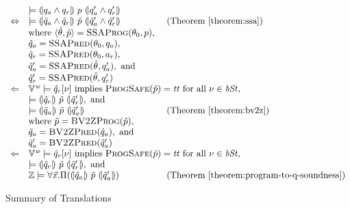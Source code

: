 \begin{figure}
\[
  \begin{array}{cll}
    & \models \hoaretriple{q_a \wedge q_r}{p}{q_a' \wedge q_r'}\\
    \Leftrightarrow
    & \models
      \hoaretriple{\hat{q}_a \wedge \hat{q}_r}
      {\hat{p}}
      {\hat{q}_a' \wedge \hat{q}_r'}
    & \textmd{ (Theorem~\ref{theorem:ssa})}\\
    &
      \textmd{where } \langle \hat{\theta}, \hat{p} \rangle =
      \textsc{SSAProg} (\theta_0, p), \\
    & \hat{q}_a = \textsc{SSAPred}(\theta_0, q_a), \\
    & \hat{q}_r = \textsc{SSAPred}(\theta_0, a_r), \\
    & \hat{q}_a' = \textsc{SSAPred}(\hat{\theta}, q_a'), \textmd{ and} \\
    & \hat{q}_r' = \textsc{SSAPred}(\hat{\theta}, q_r') \\
    \Leftarrow
    & \multicolumn{2}{l}{\BV^\wordsize \models \hat{q}_r[\bvst] \textmd{ implies } \textsc{ProgSafe}(\hat{p}) = \btt \textmd{ for all } \bvst \in \bvSt,} \\
    & \models \hoaretriple{\hat{q}_r}{\hat{p}}{\hat{q}_r'}, \textmd{ and } \\
    & \models \hoaretriple{\tilde{q}_a}{\tilde{p}}{\tilde{q}_a'}
    & \textmd{ (Theorem~\ref{theorem:bv2z})} \\
    & \textmd{where } \tilde{p} = \textsc{BV2ZProg}(\hat{p}), \\
    & \tilde{q}_a = \textsc{BV2ZPred}(\hat{q}_a), \textmd{ and} \\
    & \tilde{q}_a' = \textsc{BV2ZPred}(\hat{q}_a') \\
    \Leftarrow
    & \multicolumn{2}{l}{\BV^\wordsize \models \hat{q}_r[\bvst] \textmd{ implies } \textsc{ProgSafe}(\hat{p}) = \btt \textmd{ for all } \bvst \in \bvSt,} \\
    & \models \hoaretriple{\hat{q}_r}{\hat{p}}{\hat{q}_r'}, \textmd{ and } \\
    & \bbfZ \models \forall \vx.
      \Pi (\hoaretriple{\tilde{q}_a}{\tilde{p}}{\tilde{q}_a'})
    & \textmd{ (Theorem~\ref{theorem:program-to-q-soundness})}
  \end{array}
\]
  \caption{Summary of Translations}
  \label{fig:summary}
\end{figure}

